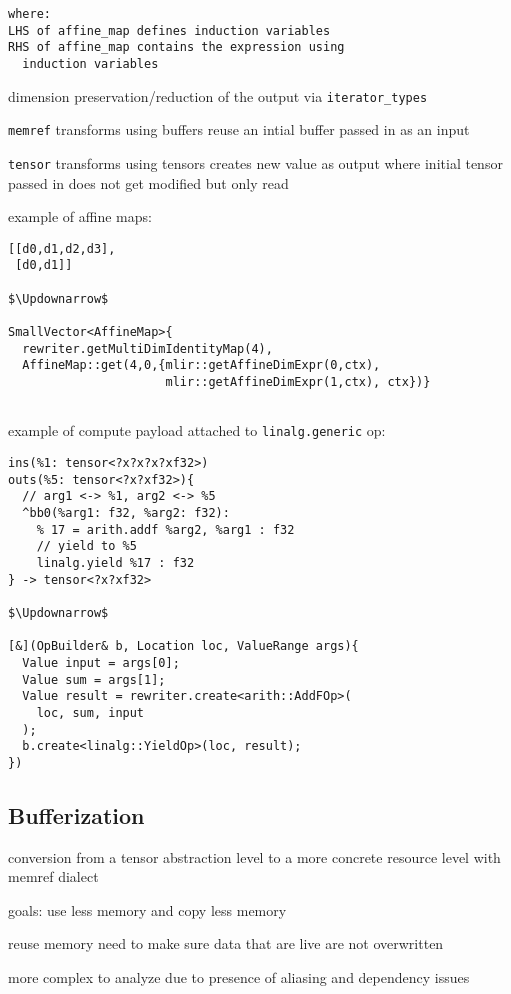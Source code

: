 \documentclass[8pt]{extarticle}
\begin{document}
\begin{multicols*}{2}
\begin{lstlisting}
where:
LHS of affine_map defines induction variables
RHS of affine_map contains the expression using
  induction variables
\end{lstlisting}

dimension preservation/reduction of the output via \verb|iterator_types|

\verb|memref| transforms using buffers reuse an intial buffer passed in as an input

\verb|tensor| transforms using tensors creates new value as output where initial tensor passed in does not get modified but only read

example of affine maps:

\begin{lstlisting}
[[d0,d1,d2,d3],
 [d0,d1]]

$\Updownarrow$

SmallVector<AffineMap>{
  rewriter.getMultiDimIdentityMap(4),
  AffineMap::get(4,0,{mlir::getAffineDimExpr(0,ctx),
                      mlir::getAffineDimExpr(1,ctx), ctx})}
 
\end{lstlisting}

example of compute payload attached to \verb|linalg.generic| op:

\begin{lstlisting}
ins(%1: tensor<?x?x?x?xf32>)
outs(%5: tensor<?x?xf32>){
  // arg1 <-> %1, arg2 <-> %5
  ^bb0(%arg1: f32, %arg2: f32):
    % 17 = arith.addf %arg2, %arg1 : f32
    // yield to %5
    linalg.yield %17 : f32
} -> tensor<?x?xf32>

$\Updownarrow$

[&](OpBuilder& b, Location loc, ValueRange args){
  Value input = args[0];
  Value sum = args[1];
  Value result = rewriter.create<arith::AddFOp>(
    loc, sum, input
  );
  b.create<linalg::YieldOp>(loc, result);
})
\end{lstlisting}

\subsection{Bufferization}

conversion from a tensor abstraction level to a more concrete resource level with memref dialect

goals: use less memory and copy less memory

reuse memory need to make sure data that are live are not overwritten

more complex to analyze due to presence of aliasing and dependency issues


\end{multicols*}
\end{document}
